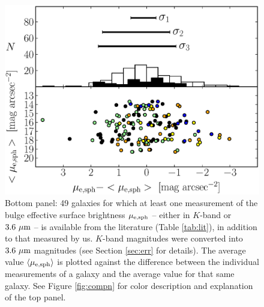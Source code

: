 \documentclass[preprint2]{emulateapj}
\begin{document}
\begin{figure}%
\begin{center}
\includegraphics[width=1.1\columnwidth]{images/comparison_all_mu_e.eps} 
\caption{Bottom panel: 49 galaxies for which at least one measurement of the bulge effective surface brightness $\mu_{\rm e,sph}$ 
-- either in $K$-band or $3.6~\rm \mu m$ -- is available from the literature (Table \ref{tab:lit}), in addition to that measured by us. 
$K$-band magnitudes were converted into $3.6~\rm \mu m$ magnitudes (see Section \ref{sec:err} for details).
The average value $\langle \mu_{\rm e,sph} \rangle$ is plotted against 
the difference between the individual measurements of a galaxy 
and the average value for that same galaxy.
See Figure \ref{fig:compn} for color description and explanation of the top panel.}
\label{fig:compmue}
\end{center}
\end{figure}
\end{document}
